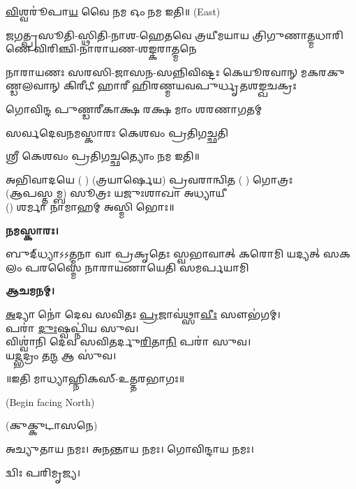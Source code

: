 \ul{𑌵𑌿}𑌶𑍍𑌵𑌰𑍂॑𑌪𑌾\ul{𑌯} 𑌵𑍈 𑌨𑌮 𑌓𑌂 𑌨𑌮 𑌇𑌤𑌿॥
{\scriptsize (East)}

{𑌜𑌗𑌤𑍍𑌪𑍍𑌰𑌸𑍂𑌤𑌿-𑌸𑍍𑌥𑌿𑌤𑌿-𑌨𑌾𑌶-𑌹𑍇𑌤𑌵𑍇}
{𑌤𑍍𑌰𑌯𑍀𑌮𑌯𑌾𑌯 𑌤𑍍𑌰𑌿𑌗𑍁𑌣𑌾𑌤𑍍𑌮𑌧𑌾𑌰𑌿𑌣𑍇}
{𑌵𑌿𑌰𑌿𑌞𑍍𑌚𑌿-𑌨𑌾𑌰𑌾𑌯𑌣-𑌶𑌙𑍍𑌕𑌰𑌾𑌤𑍍𑌮𑌨𑍇}

{𑌨𑌾𑌰𑌾𑌯𑌣𑌃 𑌸𑌰𑌸𑌿-𑌜𑌾𑌸𑌨-𑌸𑌨𑍍𑌨𑌿𑌵𑌿𑌷𑍍𑌟𑌃}
{𑌕𑍇𑌯𑍂𑌰𑌵𑌾𑌨𑍍 𑌮𑌕𑌰𑌕𑍁𑌣𑍍𑌡𑌲𑌵𑌾𑌨𑍍 𑌕𑌿𑌰𑍀𑌟𑍀}
{𑌹𑌾𑌰𑍀 𑌹𑌿𑌰𑌣𑍍𑌮𑌯𑌵𑌪𑍁𑌰𑍍𑌧𑍃𑌤𑌶𑌙𑍍𑌖𑌚𑌕𑍍𑌰𑌃}

{𑌗𑍋𑌵𑌿𑌨𑍍𑌦 𑌪𑍁𑌣𑍍𑌡𑌰𑍀𑌕𑌾𑌕𑍍𑌷 𑌰𑌕𑍍𑌷 𑌮𑌾𑌂 𑌶𑌰𑌣𑌾𑌗𑌤𑌮𑍍}

{𑌸𑌰𑍍𑌵𑌦𑍇𑌵𑌨𑌮𑌸𑍍𑌕𑌾𑌰𑌃 𑌕𑍇𑌶𑌵𑌂 𑌪𑍍𑌰𑌤𑌿𑌗𑌚𑍍𑌛𑌤𑌿}

𑌶𑍍𑌰𑍀 𑌕𑍇𑌶𑌵𑌂 𑌪𑍍𑌰𑌤𑌿𑌗𑌚𑍍𑌛𑌤𑍍𑌯𑍋𑌂 𑌨𑌮 𑌇𑌤𑌿॥

𑌅𑌭𑌿𑌵𑌾𑌦𑌯𑍇 ( ) (𑌤𑍍𑌰𑌯𑌾𑌰𑍍𑌷𑍇𑌯) 𑌪𑍍𑌰𑌵𑌰𑌾𑌨𑍍𑌵𑌿𑌤 ( ) 𑌗𑍋𑌤𑍍𑌰𑌃\\
(𑌆𑌪𑌸𑍍𑌤𑌮𑍍𑌬) 𑌸𑍂𑌤𑍍𑌰𑌃 𑌯𑌜𑍁𑌃𑌶𑌾𑌖𑌾 𑌅𑌧𑍍𑌯𑌾𑌯𑍀\\
() 𑌶𑌰𑍍𑌮𑌾 𑌨𑌾𑌮𑌾𑌹𑌮𑍍 𑌅𑌸𑍍𑌮𑌿 𑌭𑍋𑌃॥

\textbf{𑌨𑌮𑌸𑍍𑌕𑌾𑌰𑌃।}

{𑌬𑍁𑌦𑍍‌𑌧𑍍𑌯𑌾𑌽𑌽𑌤𑍍𑌮𑌨𑌾 𑌵𑌾 𑌪𑍍𑌰𑌕𑍃𑌤𑍇𑌃 𑌸𑍍𑌵𑌭𑌾𑌵𑌾𑌤𑍍}
{𑌕𑌰𑍋𑌮𑌿 𑌯𑌦𑍍𑌯𑌤𑍍 𑌸𑌕𑌲𑌂 𑌪𑌰𑌸𑍍𑌮𑍈}
{𑌨𑌾𑌰𑌾𑌯𑌣𑌾𑌯𑍇𑌤𑌿 𑌸𑌮𑌰𑍍𑌪𑌯𑌾𑌮𑌿}

\textbf{𑌆𑌚𑌮𑌨𑌮𑍍।}


\ul{𑌅}𑌦𑍍𑌯𑌾 𑌨𑍋॑ 𑌦𑍇𑌵 𑌸𑌵𑌿𑌤𑌃 \ul{𑌪𑍍𑌰}𑌜𑌾𑌵॑𑌥𑍍𑌸𑌾\ul{𑌵𑍀𑌃} 𑌸𑍗𑌭॑𑌗𑌮𑍍।\\
𑌪𑌰𑌾॑ \ul{𑌦𑍁𑌃}𑌷𑍍𑌵𑌪𑍍𑌨𑌿॑𑌯 𑌸𑍁𑌵।\\
𑌵𑌿𑌶𑍍𑌵𑌾॑𑌨𑌿 𑌦𑍇𑌵 𑌸𑌵𑌿𑌤𑌰𑍍𑌦𑍁\ul{𑌰𑌿}𑌤𑌾\ul{𑌨𑌿} 𑌪𑌰𑌾॑ 𑌸𑍁𑌵।\\
𑌯\ul{𑌦𑍍𑌭}𑌦𑍍𑌰𑌂 𑌤\ul{𑌨𑍍𑌮} 𑌆 𑌸𑍁॑𑌵।

\centerline{॥𑌇𑌤𑌿 𑌮𑌾𑌧𑍍𑌯𑌾𑌹𑍍𑌨𑌿𑌕𑌸𑍍-𑌉𑌤𑍍𑌤𑌰𑌭𑌾𑌗𑌃॥}


\renewcommand{\sectionmark}[1]{%
\markboth{\large #1 (𑌸𑌾𑌯𑌂 𑌸𑌨𑍍𑌧𑍍𑌯𑌾)}{}}

{\scriptsize (Begin facing North)}


(𑌕𑍁𑌕𑍍𑌕𑍁𑌟𑌾𑌸𑌨𑍇)

𑌅𑌚𑍍𑌯𑍁𑌤𑌾𑌯 𑌨𑌮𑌃। 𑌅𑌨𑌨𑍍𑌤𑌾𑌯 𑌨𑌮𑌃। 𑌗𑍋𑌵𑌿𑌨𑍍𑌦𑌾𑌯 𑌨𑌮𑌃। 

𑌦𑍍𑌵𑌿𑌃 𑌪𑌰𑌿𑌮𑍃𑌜𑍍𑌯।



